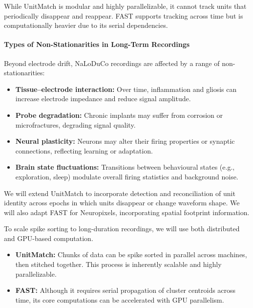While UnitMatch is modular and highly parallelizable, it cannot track units that periodically disappear and reappear. FAST supports tracking across time but is computationally heavier due to its serial dependencies.

\paragraph{Types of Non-Stationarities in Long-Term Recordings}
Beyond electrode drift, NaLoDuCo recordings are affected by a range of non-stationarities:

\begin{itemize}
    \item \textbf{Tissue–electrode interaction:} Over time, inflammation and gliosis can increase electrode impedance and reduce signal amplitude.
    \item \textbf{Probe degradation:} Chronic implants may suffer from corrosion or microfractures, degrading signal quality.
    \item \textbf{Neural plasticity:} Neurons may alter their firing properties or synaptic connections, reflecting learning or adaptation.
    \item \textbf{Brain state fluctuations:} Transitions between behavioural states (e.g., exploration, sleep) modulate overall firing statistics and background noise.
\end{itemize}

We will extend UnitMatch to incorporate detection and reconciliation of unit identity across epochs in which units disappear or change waveform shape. We will also adapt FAST for Neuropixels, incorporating spatial footprint information.

\label{sec:offlineMethodsScaling}

To scale spike sorting to long-duration recordings, we will use both distributed and GPU-based computation.

\begin{itemize}
    \item \textbf{UnitMatch:} Chunks of data can be spike sorted in parallel across machines, then stitched together. This process is inherently scalable and highly parallelizable.
    \item \textbf{FAST:} Although it requires serial propagation of cluster centroids across time, its core computations can be accelerated with GPU parallelism.
\end{itemize}

